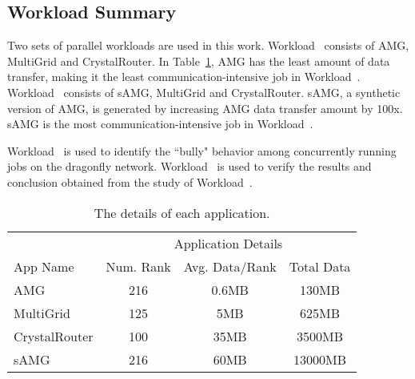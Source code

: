 \subsection{Workload Summary}
\label{sec:workload summary}

Two sets of parallel workloads are used in this work. Workload~ consists of AMG, MultiGrid and CrystalRouter. In Table~\ref{tab:apps-detail}, AMG has the least amount of data transfer, making it the least communication-intensive job in Workload~. Workload~ consists of sAMG, MultiGrid and CrystalRouter. sAMG, a synthetic version of AMG, is generated by increasing AMG data transfer amount by 100x. sAMG is the most communication-intensive job in Workload~. 

Workload~ is used to identify the ``bully" behavior among concurrently running jobs on the dragonfly network. Workload~ is used to verify the results and conclusion obtained from the study of Workload~.


\begin{table}[ht]
\begin{center}
\caption{The details of each application.} 
\label{tab:apps-detail}
\begin{tabular}{l c c c }
\toprule %
\toprule
&\multicolumn{3}{c}{Application Details} \\ 
\cmidrule(l){2-4}
App Name & Num. Rank & Avg. Data/Rank & Total Data\\ %
\midrule %
AMG  &    216 &   0.6MB   &     130MB\\ %
\midrule
MultiGrid  &    125 &   5MB   &     625MB\\ 
\midrule
CrystalRouter  &   100  &  35MB    &     3500MB\\ 
\midrule
sAMG  &    216 &   60MB   &     13000MB\\ %
\midrule %
\bottomrule %
\end{tabular}
\end{center}
\end{table}

